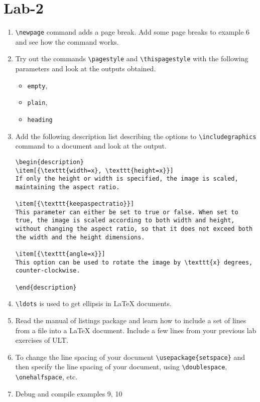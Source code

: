 \documentclass[11pt]{article}
\begin{document}
\section{Lab-2}
\label{sec-2}


\begin{enumerate}
\item \texttt{\textbackslash{}newpage} command adds a page break. Add some page breaks to
     example 6 and see how the command works.
\item Try out the commands \texttt{\textbackslash{}pagestyle} and \texttt{\textbackslash{}thispagestyle} with the
     following parameters and look at the outputs obtained.

\begin{itemize}
\item \texttt{empty},
\item \texttt{plain},
\item \texttt{heading}
\end{itemize}

\item Add the following description list describing the options to
     \texttt{\textbackslash{}includegraphics} command to a document and look at the output. 

\begin{verbatim}
\begin{description}
\item[{\texttt{width=x}, \texttt{height=x}}] 
If only the height or width is specified, the image is scaled, maintaining the aspect ratio.

\item[{\texttt{keepaspectratio}}]  
This parameter can either be set to true or false. When set to true, the image is scaled according to both width and height, without changing the aspect ratio, so that it does not exceed both the width and the height dimensions.

\item[{\texttt{angle=x}}] 
This option can be used to rotate the image by \texttt{x} degrees, counter-clockwise.

\end{description}
\end{verbatim}
\item \texttt{\textbackslash{}ldots} is used to get ellipsis in \LaTeX{} documents.
\item Read the manual of listings package and learn how to include a
     set of lines from a file into a \LaTeX{} document. Include a few
     lines from your previous lab exercises of ULT.
\item To change the line spacing of your document
     \texttt{\textbackslash{}usepackage\{setspace\}} and then specify the line spacing of
     your document, using \texttt{\textbackslash{}doublespace}, \texttt{\textbackslash{}onehalfspace}, etc.
\item Debug and compile examples 9, 10
\end{enumerate}
\end{document}
